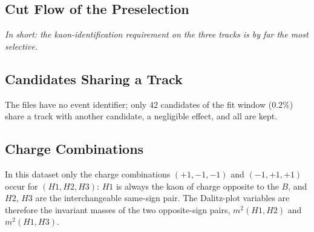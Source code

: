 \subsection{Cut Flow of the Preselection}
\label{app:cutflow}
\emph{In short: the kaon-identification requirement on the three tracks is by far the most selective.}
\begin{table}[h]
\centering
{}
\caption{Number of candidates passing each requirement alone and after the cumulative selection, in the order of the table, and by magnet polarity. The kaon-identification requirement on the three tracks is by far the most selective.}
\label{tab:cutflow}
\end{table}


\subsection{Candidates Sharing a Track}
The files have no event identifier; only $42$ candidates of the fit window ($0.2\%$) share a track with another candidate, a negligible effect, and all are kept.

\subsection{Charge Combinations}
In this dataset only the charge combinations $(+1,-1,-1)$ and $(-1,+1,+1)$ occur for $(H1,H2,H3)$: $H1$ is always the kaon of charge opposite to the $B$, and $H2$, $H3$ are the interchangeable same-sign pair. The Dalitz-plot variables are therefore the invariant masses of the two opposite-sign pairs, $m^2(H1,H2)$ and $m^2(H1,H3)$.

